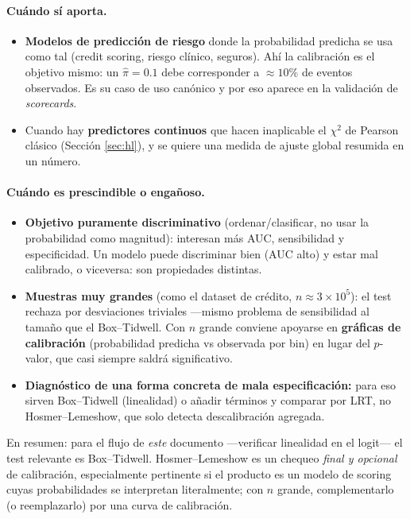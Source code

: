 \documentclass[11pt]{article}
\theoremstyle{plain}
\theoremstyle{definition}
\theoremstyle{remark}
\begin{document}
\paragraph{Cuándo sí aporta.}
\begin{itemize}
  \item \textbf{Modelos de predicción de riesgo} donde la probabilidad predicha
        se usa como tal (credit scoring, riesgo clínico, seguros). Ahí la
        calibración es el objetivo mismo: un $\hat\pi=0.1$ debe corresponder a
        $\approx10\%$ de eventos observados. Es su caso de uso canónico y por eso
        aparece en la validación de \emph{scorecards}.
  \item Cuando hay \textbf{predictores continuos} que hacen inaplicable el
        $\chi^2$ de Pearson clásico (Sección \ref{sec:hl}), y se quiere una
        medida de ajuste global resumida en un número.
\end{itemize}

\paragraph{Cuándo es prescindible o engañoso.}
\begin{itemize}
  \item \textbf{Objetivo puramente discriminativo} (ordenar/clasificar, no usar
        la probabilidad como magnitud): interesan más AUC, sensibilidad y
        especificidad. Un modelo puede discriminar bien (AUC alto) y estar mal
        calibrado, o viceversa: son propiedades distintas.
  \item \textbf{Muestras muy grandes} (como el dataset de crédito,
        $n\approx3\times10^5$): el test rechaza por desviaciones triviales
        ---mismo problema de sensibilidad al tamaño que el Box--Tidwell. Con
        $n$ grande conviene apoyarse en \textbf{gráficas de calibración}
        (probabilidad predicha vs observada por bin) en lugar del $p$-valor, que
        casi siempre saldrá significativo.
  \item \textbf{Diagnóstico de una forma concreta de mala especificación:} para
        eso sirven Box--Tidwell (linealidad) o añadir términos y comparar por
        LRT, no Hosmer--Lemeshow, que solo detecta descalibración agregada.
\end{itemize}

En resumen: para el flujo de \emph{este} documento ---verificar linealidad en el
logit--- el test relevante es Box--Tidwell. Hosmer--Lemeshow es un chequeo
\emph{final y opcional} de calibración, especialmente pertinente si el producto
es un modelo de scoring cuyas probabilidades se interpretan literalmente; con
$n$ grande, complementarlo (o reemplazarlo) por una curva de calibración.
\end{document}
